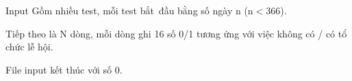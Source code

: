 Input
Gồm nhiều test, mỗi test bắt đầu bằng số ngày n (n$<$366).

Tiếp theo là N dòng, mỗi dòng ghi 16 số 0/1 tương ứng với việc không có / có tổ chức lễ hội.

File input kết thúc với số 0.